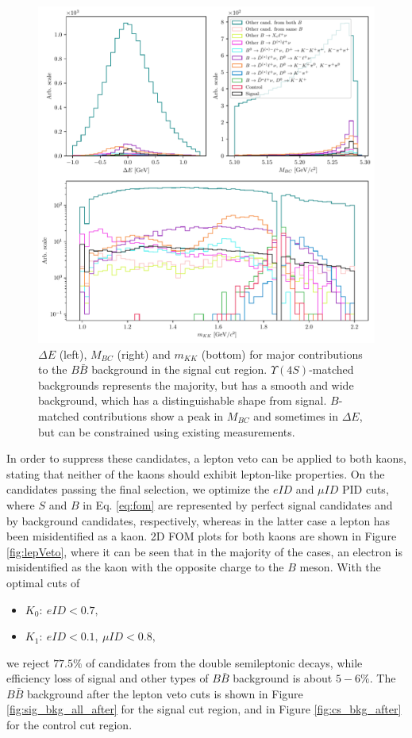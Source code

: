 \begin{figure}[H]
	\centering
	\captionsetup{width=0.8\linewidth}
	\includegraphics[width=\linewidth]{fig/sig_BKG_composition_all_before.pdf}
	\caption{$\Delta E$ (left), $M_{BC}$ (right) and $m_{KK}$ (bottom) for major contributions to the $B \bar B$ background in the signal cut region. $\Upsilon(4S)$-matched backgrounds represents the majority, but has a smooth and wide background, which has a distinguishable shape from signal. $B$-matched contributions show a peak in $M_{BC}$ and sometimes in $\Delta E$, but can be constrained using existing measurements.}
	\label{fig:sig_bkg_all_before}
\end{figure} 

In order to suppress these candidates, a lepton veto can be applied to both kaons, stating that neither of the kaons should exhibit lepton-like properties. On the candidates passing the final selection, we optimize the $eID$ and $\mu ID$ PID cuts, where $S$ and $B$ in Eq. \ref{eq:fom} are represented by perfect signal candidates and by background candidates, respectively, whereas in the latter case a lepton has been misidentified as a kaon. 2D FOM plots for both kaons are shown in Figure \ref{fig:lepVeto}, where it can be seen that in the majority of the cases, an electron is misidentified as the kaon with the opposite charge to the $B$ meson. With the optimal cuts of 
\begin{itemize}
	\item $K_0:~eID < 0.7,$
	\item $K_1:~eID < 0.1,~\mu ID < 0.8,$
\end{itemize}
we reject $77.5\%$ of candidates from the double semileptonic decays, while efficiency loss of signal and other types of $B \bar B$ background is about $5-6\%$. The $B \bar B$ background after the lepton veto cuts is shown in Figure \ref{fig:sig_bkg_all_after} for the signal cut region, and in Figure \ref{fig:cs_bkg_after} for the control cut region.

